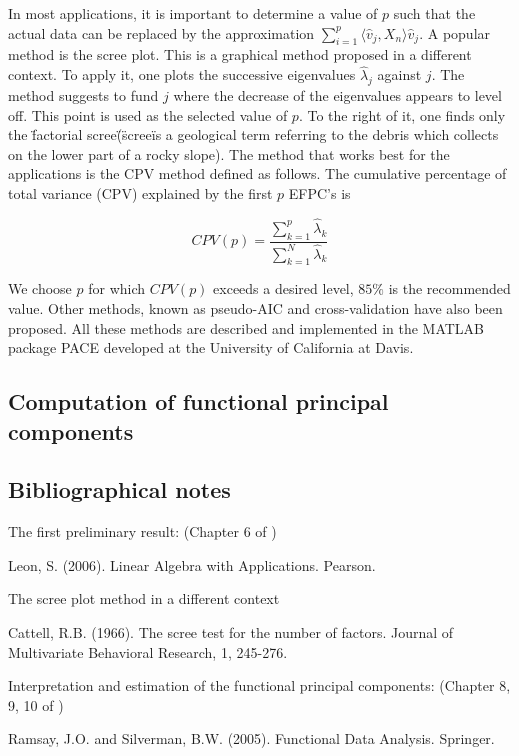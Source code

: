 In most applications, it is important to determine a value of $p$ such that the actual data can be replaced by the approximation $\sum_{i=1}^{p}\langle{}\hat{v}_j, X_n\rangle{}\hat{v}_j$. A popular method is the scree plot. This is a graphical method proposed in a different context. To apply it, one plots the successive eigenvalues $\hat{\lambda}_j$ against $j$. The method suggests to fund $j$ where the decrease of the eigenvalues appears to level off. This point is used as the selected value of $p$. To the right of it, one finds only the \"factorial scree\" (\"scree\" is a geological term referring to the debris which collects on the lower part of a rocky slope). The method that works best for the applications is the CPV method defined as follows. The cumulative percentage of total variance (CPV) explained by the first $p$ EFPC's is

\begin{equation}
  CPV(p) = \frac{\sum_{k=1}^{p}\hat{\lambda}_k}{\sum_{k=1}^{N}\hat{\lambda}_k}
\end{equation}

We choose $p$ for which $CPV(p)$ exceeds a desired level, $85\%$ is the recommended value. Other methods, known as pseudo-AIC and cross-validation have also been proposed. All these methods are described and implemented in the MATLAB package PACE developed at the University of California at Davis.

\subsection{Computation of functional principal components}

\subsection{Bibliographical notes}

The first preliminary result: (Chapter 6 of )

Leon, S. (2006). Linear Algebra with Applications. Pearson.

The scree plot method in a different context

Cattell, R.B. (1966). The scree test for the number of factors. Journal of Multivariate Behavioral Research, 1, 245-276.

Interpretation and estimation of the functional principal components: (Chapter 8, 9, 10 of )

Ramsay, J.O. and Silverman, B.W. (2005). Functional Data Analysis. Springer.

